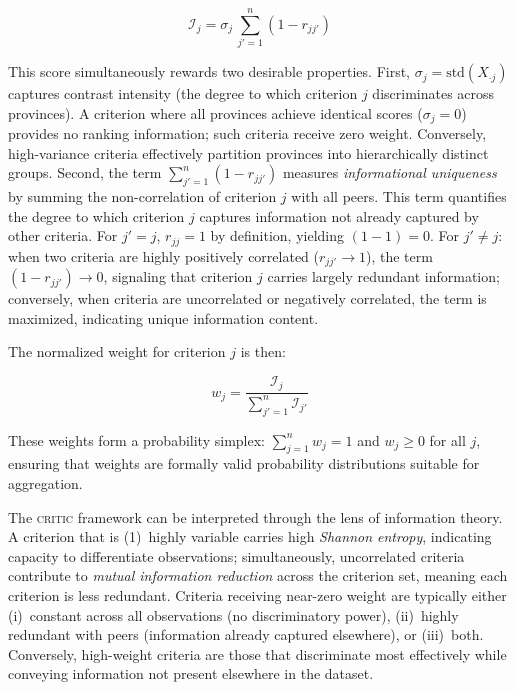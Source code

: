 \documentclass[12pt,a4paper]{article}
\newcommand{\CRITIC}{\textsc{critic}\xspace}
\begin{document}
\begin{equation}
\label{eq:critic_score}
\mathcal{I}_j = \sigma_j \, \sum_{j'=1}^{n} (1 - r_{jj'})
\end{equation}

This score simultaneously rewards two desirable properties. First, $\sigma_j = \text{std}(X_{\cdot j})$ captures contrast intensity (the degree to which criterion $j$ discriminates across provinces). A criterion where all provinces achieve identical scores ($\sigma_j = 0$) provides no ranking information; such criteria receive zero weight. Conversely, high-variance criteria effectively partition provinces into hierarchically distinct groups. Second, the term $\sum_{j'=1}^{n} (1 - r_{jj'})$ measures \emph{informational uniqueness} by summing the non-correlation of criterion $j$ with all peers. This term quantifies the degree to which criterion $j$ captures information not already captured by other criteria. For $j' = j$, $r_{jj} = 1$ by definition, yielding $(1 - 1) = 0$. For $j' \neq j$: when two criteria are highly positively correlated ($r_{jj'} \to 1$), the term $(1 - r_{jj'}) \to 0$, signaling that criterion $j$ carries largely redundant information; conversely, when criteria are uncorrelated or negatively correlated, the term is maximized, indicating unique information content.

The normalized weight for criterion $j$ is then:

\begin{equation}
\label{eq:critic_weight}
w_j = \frac{\mathcal{I}_j}{\sum_{j'=1}^{n} \mathcal{I}_{j'}}
\end{equation}

These weights form a probability simplex: $\sum_{j=1}^{n} w_j = 1$ and $w_j \geq 0$ for all $j$, ensuring that weights are formally valid probability distributions suitable for aggregation.

The \CRITIC framework can be interpreted through the lens of information theory. A criterion that is (1)~highly variable carries high \emph{Shannon entropy}, indicating capacity to differentiate observations; simultaneously, uncorrelated criteria contribute to \emph{mutual information reduction} across the criterion set, meaning each criterion is less redundant. Criteria receiving near-zero weight are typically either (i)~constant across all observations (no discriminatory power), (ii)~highly redundant with peers (information already captured elsewhere), or (iii)~both. Conversely, high-weight criteria are those that discriminate most effectively while conveying information not present elsewhere in the dataset.
\end{document}
